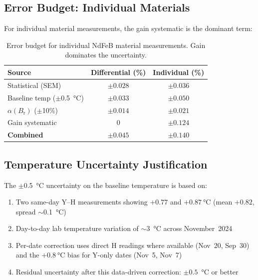 \documentclass[11pt,letterpaper]{article}
\newcommand{\Br}{B_\mathrm{r}}
\newcommand{\alphar}{\alpha(\Br)}
\begin{document}

\subsection{Error Budget: Individual Materials}

For individual material measurements, the gain systematic is the dominant term:

\begin{table}[H]
\centering
\caption{Error budget for individual NdFeB material measurements. Gain
dominates the uncertainty.}
\label{tab:error_budget_individual}
\begin{tabular}{@{}lcc@{}}
\toprule
\textbf{Source} & \textbf{Differential (\%)} & \textbf{Individual (\%)} \\
\midrule
Statistical (SEM) & $\pm 0.028$ & $\pm 0.036$ \\
Baseline temp ($\pm$\SI{0.5}{\celsius}) & $\pm 0.033$ & $\pm 0.050$ \\
$\alphar$ ($\pm$10\%) & $\pm 0.014$ & $\pm 0.021$ \\
Gain systematic & $0$ & $\pm 0.124$ \\
\midrule
\textbf{Combined} & $\pm 0.045$ & $\pm 0.140$ \\
\bottomrule
\end{tabular}
\end{table}

\subsection{Temperature Uncertainty Justification}

The $\pm$\SI{0.5}{\celsius} uncertainty on the baseline temperature is based on:
\begin{enumerate}
    \item Two same-day Y--H measurements showing $+0.77$ and $+\SI{0.87}{\celsius}$
    (mean $+0.82$, spread $\sim$\SI{0.1}{\celsius})
    \item Day-to-day lab temperature variation of $\sim$\SI{3}{\celsius} across
    November~2024
    \item Per-date correction uses direct H readings where available
    (Nov~20, Sep~30) and the $+\SI{0.8}{\celsius}$ bias for Y-only dates
    (Nov~5, Nov~7)
    \item Residual uncertainty after this data-driven correction: $\pm 0.5$~\si{\celsius}
    or better
\end{enumerate}
\end{document}
